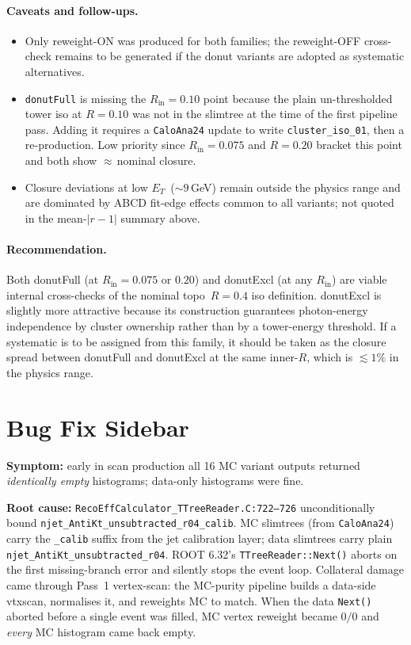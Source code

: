 \documentclass[11pt,a4paper]{article}
\newcommand{\etg}{$E_T$}
\begin{document}
\paragraph{Caveats and follow-ups.}
\begin{itemize}
\item Only reweight-ON was produced for both families; the
reweight-OFF cross-check remains to be generated if the donut
variants are adopted as systematic alternatives.
\item \texttt{donutFull} is missing the $R_\text{in}=0.10$ point
because the plain un-thresholded tower iso at $R=0.10$ was not in the
slimtree at the time of the first pipeline pass. Adding it requires
a \texttt{CaloAna24} update to write \texttt{cluster\_iso\_01}, then
a re-production. Low priority since $R_\text{in}=0.075$ and $R=0.20$
bracket this point and both show $\approx$\,nominal closure.
\item Closure deviations at low \etg\ ($\sim\!9$\,GeV) remain outside
the physics range and are dominated by ABCD fit-edge effects common
to all variants; not quoted in the mean-$|r-1|$ summary above.
\end{itemize}

\paragraph{Recommendation.} Both donutFull (at $R_\text{in}=0.075$
or $0.20$) and donutExcl (at any $R_\text{in}$) are viable internal
cross-checks of the nominal topo~$R=0.4$ iso definition. donutExcl is
slightly more attractive because its construction guarantees
photon-energy independence by cluster ownership rather than by a
tower-energy threshold. If a systematic is to be assigned from this
family, it should be taken as the closure spread between donutFull
and donutExcl at the same inner-$R$, which is $\lesssim 1\%$ in the
physics range.

\section{Bug Fix Sidebar}
\label{sec:bugfix}

\textbf{Symptom:} early in scan production all 16 MC variant outputs
returned \emph{identically empty} histograms; data-only histograms
were fine.

\textbf{Root cause:}
\texttt{RecoEffCalculator\_TTreeReader.C:722--726} unconditionally
bound \texttt{njet\_AntiKt\_unsubtracted\_r04\_calib}. MC slimtrees
(from \texttt{CaloAna24}) carry the \texttt{\_calib} suffix from the
jet calibration layer; data slimtrees carry plain
\texttt{njet\_AntiKt\_unsubtracted\_r04}. ROOT 6.32's
\texttt{TTreeReader::Next()} aborts on the first missing-branch
error and silently stops the event loop. Collateral damage came
through Pass~1 vertex-scan: the MC-purity pipeline builds a
data-side vtxscan, normalises it, and reweights MC to match. When
the data \texttt{Next()} aborted before a single event was filled,
MC vertex reweight became $0/0$ and \emph{every} MC histogram came
back empty.
\end{document}
